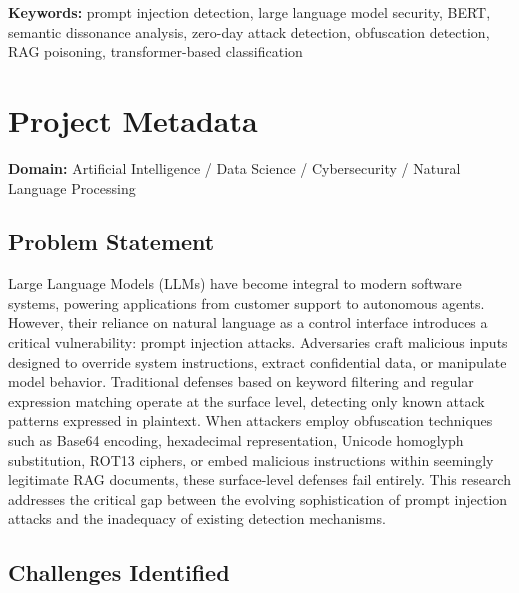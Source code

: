 \documentclass[11pt]{article}
\begin{document}
\noindent\textbf{Keywords:} prompt injection detection, large language model security, BERT, semantic dissonance analysis, zero-day attack detection, obfuscation detection, RAG poisoning, transformer-based classification

\section*{Project Metadata}

\textbf{Domain:} Artificial Intelligence / Data Science / Cybersecurity / Natural Language Processing

\subsection*{Problem Statement}

Large Language Models (LLMs) have become integral to modern software systems, powering applications from customer support to autonomous agents. However, their reliance on natural language as a control interface introduces a critical vulnerability: prompt injection attacks. Adversaries craft malicious inputs designed to override system instructions, extract confidential data, or manipulate model behavior. Traditional defenses based on keyword filtering and regular expression matching operate at the surface level, detecting only known attack patterns expressed in plaintext. When attackers employ obfuscation techniques such as Base64 encoding, hexadecimal representation, Unicode homoglyph substitution, ROT13 ciphers, or embed malicious instructions within seemingly legitimate RAG documents, these surface-level defenses fail entirely. This research addresses the critical gap between the evolving sophistication of prompt injection attacks and the inadequacy of existing detection mechanisms.

\subsection*{Challenges Identified}
\end{document}

